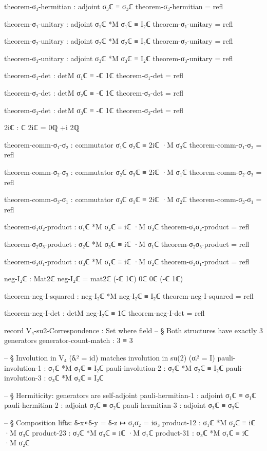 \documentclass[11pt,a4paper]{book}
\begin{document}
\begin{code}
theorem-σ₃-hermitian : adjoint σ₃ℂ ≡ σ₃ℂ
theorem-σ₃-hermitian = refl

theorem-σ₁-unitary : adjoint σ₁ℂ *M σ₁ℂ ≡ I₂ℂ
theorem-σ₁-unitary = refl

theorem-σ₂-unitary : adjoint σ₂ℂ *M σ₂ℂ ≡ I₂ℂ
theorem-σ₂-unitary = refl

theorem-σ₃-unitary : adjoint σ₃ℂ *M σ₃ℂ ≡ I₂ℂ
theorem-σ₃-unitary = refl

theorem-σ₁-det : detM σ₁ℂ ≡ -ℂ 1ℂ
theorem-σ₁-det = refl

theorem-σ₂-det : detM σ₂ℂ ≡ -ℂ 1ℂ
theorem-σ₂-det = refl

theorem-σ₃-det : detM σ₃ℂ ≡ -ℂ 1ℂ
theorem-σ₃-det = refl

2iℂ : ℂ
2iℂ = 0ℚ +i 2ℚ

theorem-comm-σ₁-σ₂ : commutator σ₁ℂ σ₂ℂ ≡ 2iℂ ·M σ₃ℂ
theorem-comm-σ₁-σ₂ = refl

theorem-comm-σ₂-σ₃ : commutator σ₂ℂ σ₃ℂ ≡ 2iℂ ·M σ₁ℂ
theorem-comm-σ₂-σ₃ = refl

theorem-comm-σ₃-σ₁ : commutator σ₃ℂ σ₁ℂ ≡ 2iℂ ·M σ₂ℂ
theorem-comm-σ₃-σ₁ = refl

theorem-σ₁σ₂-product : σ₁ℂ *M σ₂ℂ ≡ iℂ ·M σ₃ℂ
theorem-σ₁σ₂-product = refl

theorem-σ₂σ₃-product : σ₂ℂ *M σ₃ℂ ≡ iℂ ·M σ₁ℂ
theorem-σ₂σ₃-product = refl

theorem-σ₃σ₁-product : σ₃ℂ *M σ₁ℂ ≡ iℂ ·M σ₂ℂ
theorem-σ₃σ₁-product = refl

neg-I₂ℂ : Mat2ℂ
neg-I₂ℂ = mat2ℂ (-ℂ 1ℂ) 0ℂ 0ℂ (-ℂ 1ℂ)

theorem-neg-I-squared : neg-I₂ℂ *M neg-I₂ℂ ≡ I₂ℂ
theorem-neg-I-squared = refl

theorem-neg-I-det : detM neg-I₂ℂ ≡ 1ℂ
theorem-neg-I-det = refl

record V₄-su2-Correspondence : Set where
  field
    -- § Both structures have exactly 3 generators
    generator-count-match : 3 ≡ 3

    -- § Involution in V₄ (δᵢ² = id) matches involution in su(2) (σᵢ² = I)
    pauli-involution-1 : σ₁ℂ *M σ₁ℂ ≡ I₂ℂ
    pauli-involution-2 : σ₂ℂ *M σ₂ℂ ≡ I₂ℂ
    pauli-involution-3 : σ₃ℂ *M σ₃ℂ ≡ I₂ℂ

    -- § Hermiticity: generators are self-adjoint
    pauli-hermitian-1 : adjoint σ₁ℂ ≡ σ₁ℂ
    pauli-hermitian-2 : adjoint σ₂ℂ ≡ σ₂ℂ
    pauli-hermitian-3 : adjoint σ₃ℂ ≡ σ₃ℂ

    -- § Composition lifts: δ-x∘δ-y = δ-z  ↦  σ₁σ₂ = iσ₃
    product-12 : σ₁ℂ *M σ₂ℂ ≡ iℂ ·M σ₃ℂ
    product-23 : σ₂ℂ *M σ₃ℂ ≡ iℂ ·M σ₁ℂ
    product-31 : σ₃ℂ *M σ₁ℂ ≡ iℂ ·M σ₂ℂ


\end{code}
\end{document}
